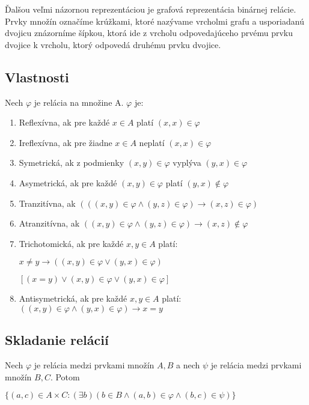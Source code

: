 		Ďalšou veľmi názornou reprezentáciou je grafová reprezentácia binárnej relácie. Prvky množín označíme krúžkami, ktoré nazývame vrcholmi grafu a usporiadanú dvojicu znázorníme šípkou, ktorá ide z vrcholu odpovedajúceho prvému prvku dvojice k vrcholu, ktorý odpovedá druhému prvku dvojice.\\

	\subsection{Vlastnosti}
		Nech  $\varphi$  je relácia na množine A. $\varphi$ je:
		\begin{enumerate}
			\item Reflexívna, ak pre každé $x \in A$ platí $( x, x ) \in \varphi $
			\item Ireflexívna, ak pre žiadne $x \in A$ neplatí $( x, x) \in \varphi $
			\item Symetrická, ak z podmienky $( x, y ) \in \varphi $ vyplýva $( y, x ) \in \varphi$
			\item Asymetrická, ak pre každé $( x, y ) \in \varphi$  platí $( y, x ) \notin \varphi$  
			\item Tranzitívna, ak $(( ( x, y ) \in \varphi  \wedge ( y, z ) \in \varphi ) \rightarrow ( x, z ) \in \varphi )$
			\item Atranzitívna, ak $(( x, y) \in \varphi  \wedge ( y,z) \in \varphi ) \rightarrow ( x,z) \notin \varphi$ 
			\item Trichotomická, ak pre každé $x, y \in A $ platí:

			$x \neq y \rightarrow (( x, y) \in \varphi  \vee ( y, x) \in \varphi ) $ 

			$[ ( x = y) \vee ( x, y) \in \varphi \vee ( y, x) \in \varphi ]$

			\item Antisymetrická, ak pre každé $x, y \in A$ platí:
			$(( x, y) \in \varphi  \wedge ( y, x) \in \varphi ) \rightarrow x = y$
		\end{enumerate}


 	\subsection{Skladanie relácií}

	  	Nech $\varphi$ je relácia medzi prvkami množín $A, B$ a nech $\psi$ je relácia medzi prvkami množín $B, C$. Potom

		$\{ ( a, c ) \in A \times C : ( \exists b)(b \in B \wedge ( a,b) \in \varphi \wedge ( b, c) \in \psi )\}$

